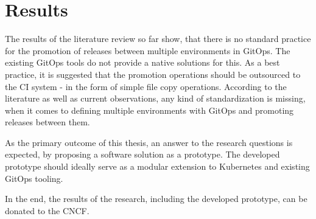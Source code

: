 \chapter{Results}

The results of the literature review so far show,
that there is no standard practice for the promotion of releases between multiple environments in GitOps.
The existing GitOps tools do not provide
a native solutions for this.
As a best practice, it is suggested that the promotion operations
should be outsourced to the CI system
- in the form of simple file copy operations.
According to the literature as well as current observations,
any kind of standardization is missing,
when it comes to defining multiple environments with GitOps
and promoting releases between them.
\bigskip

\noindent
As the primary outcome of this thesis,
an answer to the research questions is expected,
by proposing a software solution as a prototype.
The developed prototype should ideally serve as a 
modular extension to Kubernetes and existing GitOps tooling.
\bigskip

%

\noindent
In the end, the results of the research,
including the developed prototype,
can be donated to the CNCF.

